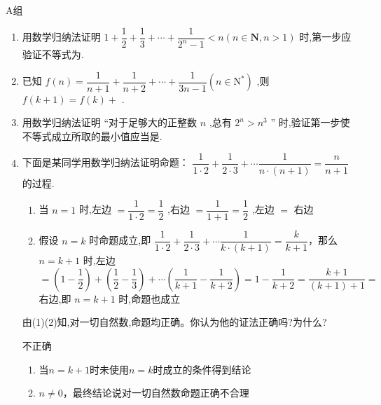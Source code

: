 A组
\begin{enumerate}
    \item 用数学归纳法证明 $1 + \dfrac{1}{2} + \dfrac{1}{3} + \cdots  + \dfrac{1}{{2}^{n} - 1} < n\left( {n \in  \mathbf{N},n > 1}\right)$ 时,第一步应验证不等式为.
    \item 已知 $f\left( n\right)  = \dfrac{1}{n + 1} + \dfrac{1}{n + 2} + \cdots  + \dfrac{1}{{3n} - 1}\left( {n \in  {\mathrm{N}}^{ * }}\right)$ ,则 $f\left( {k + 1}\right)  = f\left( k\right)  +$ .
    \item 用数学归纳法证明 “对于足够大的正整数 $n$ ,总有 ${2}^{n} > {n}^{3}$ ” 时,验证第一步使不等式成立所取的最小值应当是.
    \item 下面是某同学用数学归纳法证明命题： $\dfrac{1}{1 \cdot  2} + \dfrac{1}{2 \cdot  3} + \cdots \dfrac{1}{n \cdot  \left( {n + 1}\right) } = \dfrac{n}{n + 1}$ 的过程.
    \begin{enumerate}
        \item 当 $n = 1$ 时,左边 $= \dfrac{1}{1 \cdot  2} = \dfrac{1}{2}$ ,右边 $= \dfrac{1}{1 + 1} = \dfrac{1}{2}$ ,左边 $=$ 右边
        \item 假设 $n = k$ 时命题成立,即
        $\dfrac{1}{1 \cdot  2} + \dfrac{1}{2 \cdot  3} + \cdots \dfrac{1}{k \cdot  \left( {k + 1}\right) } = \dfrac{k}{k + 1}$，那么 $n = k + 1$ 时,左边 $= \left( {1 - \dfrac{1}{2}}\right)  + \left( {\dfrac{1}{2} - \dfrac{1}{3}}\right)  + \cdots \left( {\dfrac{1}{k + 1} - \dfrac{1}{k + 2}}\right)  = 1 - \dfrac{1}{k + 2} = \dfrac{k + 1}{\left( {k + 1}\right)  + 1} =$ 右边,即
        $n = k + 1$ 时,命题也成立
    \end{enumerate}
    由(1)(2)知,对一切自然数,命题均正确。你认为他的证法正确吗?为什么?
    \begin{jieda}
        不正确
        \begin{enumerate}
            \item 当$n = k+1$时未使用$n = k$时成立的条件得到结论
            \item $n \neq 0$，最终结论说对一切自然数命题正确不合理
        \end{enumerate}
    \end{jieda}
\end{enumerate}

